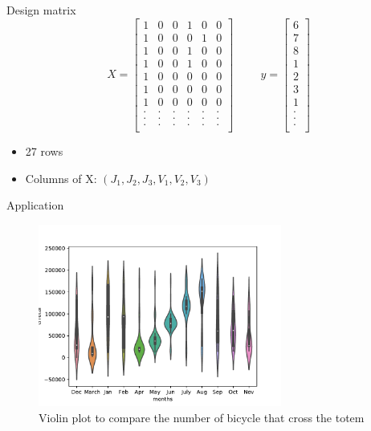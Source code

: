 \documentclass[unknownkeysallowed]{beamer}
\begin{document}
\begin{frame}{Design matrix}
$$X=\left[\begin{array}{llllll}
1 & 0 & 0 & 1 & 0 & 0\\
1 & 0 & 0 & 0 & 1 & 0\\
1 & 0 & 0 & 1 & 0 & 0\\
1 & 0 & 0 & 1 & 0 & 0\\
1 & 0 & 0 & 0 & 0 & 0\\
1 & 0 & 0 & 0 & 0 & 0\\
1 & 0 & 0 & 0 & 0 & 0\\
. & . & . & . & . & .\\
. & . & . & . & . & .\\
. & . & . & . & . & .\\
\end{array}\right]\hspace{1cm} y=\left[\begin{array}{l}
6\\
7\\
8\\
1\\
2\\
3\\
1\\
.\\
.\\
.\\
\end{array}\right]
$$
\begin{itemize}
    \item 27 rows
    \item Columns of X: $(J_1,J_2,J_3,V_1,V_2,V_3)$
\end{itemize}
\end{frame}

\begin{frame}{Application}
\begin{figure}[!tbp]
\includegraphics[width=8cm]{figure.pdf}
\vspace{.35cm}
\caption{Violin plot to compare the number of bicycle that cross the totem}
\label{fig:f1}
\end{figure}
\end{frame}
\end{document}
